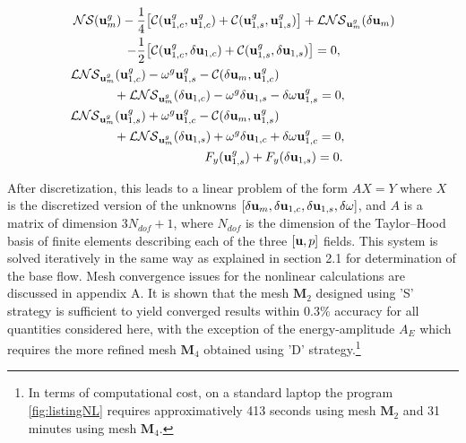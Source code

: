 \documentclass[twocolumn,10pt]{asme2ej}
\begin{document}
\begin{subequations}

\begin{align}
{\cal NS}(  {\bf u }_m^g ) - \frac{1}{4} &\big[ {\cal C}( {\bf u }_{1,c}^g,{\bf u }_{1,c}^g) +  {\cal C}( {\bf u }_{1,s}^g,{\bf u }_{1,s}^g) \big]+ {\cal LNS}_{{\bf u }_m^g}(\delta {\bf u }_m) \nonumber \\
-\frac{1}{2}& \big[ {\cal C}( {\bf u }_{1,c}^g,\delta {\bf u }_{1,c}) +  {\cal C}( {\bf u }_{1,s}^g,\delta {\bf u }_{1,s}) \big] = 0, \label{HB_1} \\
{\cal LNS}_{{\bf u }_m^g}( {\bf u }_{1,c}^g)& - \omega^g {\bf u }_{1,s}^g -  {\cal C}( \delta {\bf u }_{m}, {\bf u }_{1,c}^g) \nonumber \\
&\hspace{-0.9cm}+{\cal LNS}_{{\bf u }_m^g}( \delta {\bf u }_{1,c})  - \omega^g \delta {\bf u }_{1,s}  
 - \delta \omega {\bf u }_{1,s}^g = 0 , \label{HB_2}\\
{\cal LNS}_{{\bf u }_m^g}({\bf u }_{1,s}^g)& + \omega^g {\bf u }_{1,c}^g -  {\cal C}( \delta {\bf u }_{m}, {\bf u }_{1,s}^g) \nonumber \\
&\hspace{-0.9cm}+{\cal LNS}_{{\bf u }_m^g}( \delta {\bf u }_{1,s}) + \omega^g \delta {\bf u }_{1,c} +  \delta \omega {\bf u }_{1,c}^g= 0 , \label{HB_3} \\
&\hspace{1.65cm} F_y({\bf u }_{1,s}^g) + F_y(\delta {\bf u }_{1,s}) = 0. 
\end{align}
\end{subequations}

After discretization, this leads to a linear problem of the form $A X = Y$ where $X$ is the discretized version of the unknowns  $[\delta {\bf u }_m, \delta {\bf u }_{1,c}, \delta {\bf u }_{1,s}, \delta \omega]$, and $A$ is a matrix of dimension $3 N_{dof} +1$, where $N_{dof}$ is the dimension of the Taylor--Hood basis of finite elements describing each of the three $[{\bf u},p]$ fields.  This system is solved iteratively in the same way as explained in section 2.1 for determination of the base flow. %
Mesh convergence issues for the nonlinear calculations are discussed in appendix A. It is shown that the mesh $\mathbf{M}_2$ designed using 'S' strategy is sufficient to yield converged results within $0.3\%$ accuracy for all quantities considered here, with the exception of the energy-amplitude $A_E$ which requires the more refined mesh $\mathbf{M}_4$ obtained using 'D' strategy.\footnote{In terms of computational cost, on a standard laptop the program  \ref{fig:listingNL} requires approximatively 413 seconds using  mesh $\mathbf{M}_2$ and 31 minutes using mesh $\mathbf{M}_4$.} 
 
\end{document}
